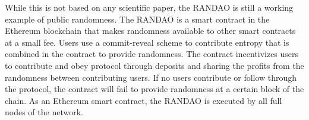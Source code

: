 While this is not based on any scientific paper, the RANDAO \cite{randao} is still a working example of public randomness. The RANDAO is a smart contract in the Ethereum blockchain that makes randomness available to other smart contracts at a small fee. Users use a commit-reveal scheme to contribute entropy that is combined in the contract to provide randomness. The contract incentivizes users to contribute and obey protocol through deposits and sharing the profits from the randomness between contributing users. If no users contribute or follow through the protocol, the contract will fail to provide randomness at a certain block of the chain. As an Ethereum smart contract, the RANDAO is executed by all full nodes of the network.
